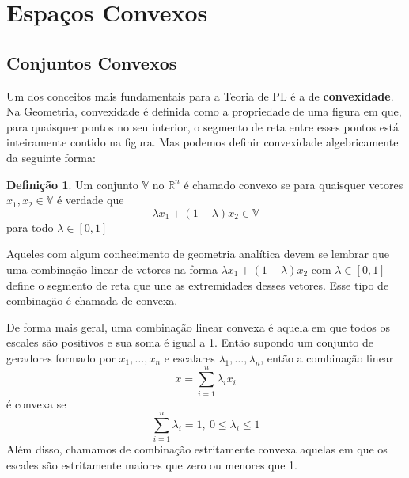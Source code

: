 \theoremstyle{definition}

\newtheorem{def:conjunto convexo}{Definição}[chapter]

\newtheorem{def:politopo}[def:conjunto convexo]{Definição}

\newtheorem{def:poliedro convexo}[def:conjunto convexo]{Definição}

\newtheorem{def:cone}[def:conjunto convexo]{Definição}

\newtheorem{def:cone hull}[def:conjunto convexo]{Definição}

\newtheorem{def:cone convexo}[def:conjunto convexo]{Definição}

\newtheorem{def:cpc}[def:conjunto convexo]{Definição}



\section{Espaços Convexos}

\subsection{Conjuntos Convexos}

Um dos conceitos mais fundamentais para a Teoria de PL é a de \textbf{convexidade}. Na Geometria, convexidade é definida como a propriedade de uma figura em que, para quaisquer pontos no seu interior, o segmento de reta entre esses pontos está inteiramente contido na figura. Mas podemos definir convexidade algebricamente da seguinte forma:

\begin{def:conjunto convexo}
	\label{def:conjunto convexo}
	Um conjunto $\mathbb{V}$ no $\mathbb{R}^n$ é chamado convexo se para quaisquer vetores $x_1, x_2 \in \mathbb{V}$ é verdade que \[\lambda x_1 + (1 - \lambda)x_2 \in \mathbb{V}\] para todo $\lambda \in [0, 1]$
\end{def:conjunto convexo}

Aqueles com algum conhecimento de geometria analítica devem se lembrar que uma combinação linear de vetores na forma $\lambda x_1 + (1 - \lambda)x_2$ com $\lambda \in [0, 1]$ define o segmento de reta que une as extremidades desses vetores. Esse tipo de combinação é chamada de convexa.

De forma mais geral, uma combinação linear convexa é aquela em que todos os escales são positivos e sua soma é igual a 1. Então supondo um conjunto de geradores formado por $x_1, \ldots, x_n$ e escalares $\lambda_1, \ldots, \lambda_n$, então a combinação linear
\[x = \sum_{i=1}^{n} \lambda_i x_i\] é convexa se \[\sum_{i=1}^{n} \lambda_i = 1,\ 0 \leq \lambda_i \leq 1\]
Além disso, chamamos de combinação estritamente convexa aquelas em que os escales são estritamente maiores que zero ou menores que 1.



